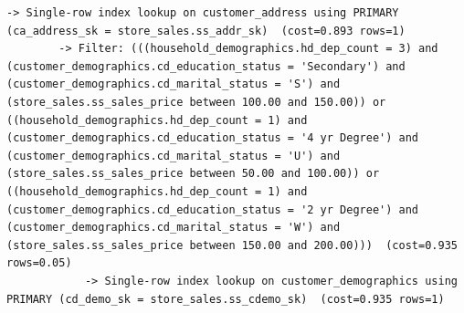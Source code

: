 \documentclass{ULBreport}
\begin{document}
\begin{lstlisting}[caption={Baseline \texttt{EXPLAIN FORMAT=TREE} on SF8 for Query 13}, label={lst:q13_explain_orig}, basicstyle=\ttfamily\scriptsize, breaklines=true, frame=single]
                -> Single-row index lookup on customer_address using PRIMARY (ca_address_sk = store_sales.ss_addr_sk)  (cost=0.893 rows=1)
        -> Filter: (((household_demographics.hd_dep_count = 3) and (customer_demographics.cd_education_status = 'Secondary') and (customer_demographics.cd_marital_status = 'S') and (store_sales.ss_sales_price between 100.00 and 150.00)) or ((household_demographics.hd_dep_count = 1) and (customer_demographics.cd_education_status = '4 yr Degree') and (customer_demographics.cd_marital_status = 'U') and (store_sales.ss_sales_price between 50.00 and 100.00)) or ((household_demographics.hd_dep_count = 1) and (customer_demographics.cd_education_status = '2 yr Degree') and (customer_demographics.cd_marital_status = 'W') and (store_sales.ss_sales_price between 150.00 and 200.00)))  (cost=0.935 rows=0.05)
            -> Single-row index lookup on customer_demographics using PRIMARY (cd_demo_sk = store_sales.ss_cdemo_sk)  (cost=0.935 rows=1)


\end{lstlisting}
\end{document}
